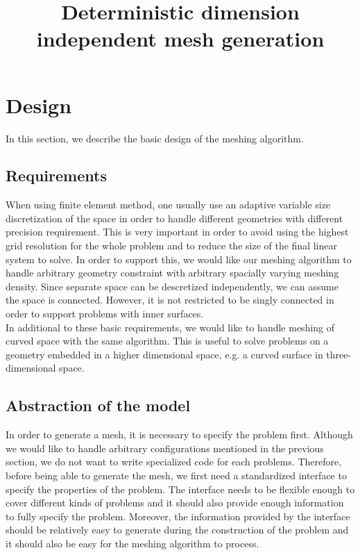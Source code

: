 \documentclass[10pt,fleqn]{article}
\title{Deterministic dimension independent mesh generation}
\begin{document}
\maketitle

\section{Design}

In this section, we describe the basic design of the meshing algorithm.

\subsection{Requirements}

When using finite element method, one usually use an adaptive variable size
discretization of the space in order to handle different geometries with
different precision requirement. This is very important in order to avoid
using the highest grid resolution for the whole problem and to reduce the
size of the final linear system to solve. In order to support this, we would
like our meshing algorithm to handle arbitrary geometry constraint with
arbitrary spacially varying meshing density. Since separate space can be
descretized independently, we can assume the space is connected. However, it is
not restricted to be singly connected in order to support problems with inner
surfaces.\\

In additional to these basic requirements, we would like to handle meshing
of curved space with the same algorithm. This is useful to solve problems on
a geometry embedded in a higher dimensional space, e.g. a curved surface in
three-dimensional space.

\subsection{Abstraction of the model}

In order to generate a mesh, it is necessary to specify the problem first.
Although we would like to handle arbitrary configurations mentioned in the
previous section, we do not want to write specialized code for each problems.
Therefore, before being able to generate the mesh, we first need a standardized
interface to specify the properties of the problem. The interface needs to be
flexible enough to cover different kinds of problems and it should also provide
enough information to fully specify the problem. Moreover, the information
provided by the interface should be relatively easy to generate during the
construction of the problem and it should also be easy for the meshing
algorithm to process.\\
\end{document}
